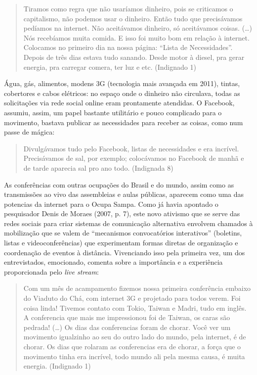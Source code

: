 \begin{quote}
Tiramos como regra que não usaríamos dinheiro, pois se criticamos o
capitalismo, não podemos usar o dinheiro. Então tudo que precisávamos
pedíamos na internet. Não aceitávamos dinheiro, só aceitávamos coisas.
(\ldots{}) Nós recebíamos muita comida. E isso foi muito bom em relação à
internet. Colocamos no primeiro dia na nossa página: ``Lista de
Necessidades''. Depois de três dias estava tudo sanando. Desde motor à
diesel, pra gerar energia, pra carregar comera, ter luz e etc.
(Indignado 1)
\end{quote}

Água, gás, alimentos, modens 3G (tecnologia mais avançada em 2011),
tintas, cobertores e cabos elétricos: no espaço onde o dinheiro não
circulava, todas as solicitações via rede social online eram prontamente
atendidas. O Facebook, assumiu, assim, um papel bastante utilitário e
pouco complicado para o movimento, bastava publicar as necessidades para
receber as coisas, como num passe de mágica:

\begin{quote}
Divulgávamos tudo pelo Facebook, listas de necessidades e era incrível.
Precisávamos de sal, por exemplo; colocávamos no Facebook de manhã e de
tarde aparecia sal pro ano todo. (Indignada 8)
\end{quote}

As conferências com outras ocupações do Brasil e do mundo, assim como as
transmissões ao vivo das assembleias e aulas públicas, aparecem como uma
das potencias da internet para o Ocupa Sampa. Como já havia apontado o
pesquisador Denis de Moraes (2007, p. 7), este novo ativismo que se
serve das redes sociais para criar sistemas de comunicação alternativa
envolvem chamados à mobilização que se valem de ``mecanismos
convocatórios interativos'' (boletins, listas e videoconferências) que
experimentam formas diretas de organização e coordenação de eventos à
distância. Vivenciando isso pela primeira vez, um dos entrevistados,
emocionado, comenta sobre a importância e a experiência proporcionada
pelo \emph{live stream}:

\begin{quote}
Com um mês de acampamento fizemos nossa primeira conferência embaixo do
Viaduto do Chá, com internet 3G e projetado para todos verem. Foi coisa
linda! Tivemos contato com Tokio, Taiwan e Madri, tudo em inglês. A
conferencia que mais me impressionou foi de Taiwan, os caras são
pedrada! (\ldots{}) Os dias das conferencias foram de chorar. Você ver um
movimento igualzinho ao seu do outro lado do mundo, pela internet, é de
chorar. Os dias que rolaram as conferencias era de chorar, a força que o
movimento tinha era incrível, todo mundo ali pela mesma causa, é muita
energia. (Indignado 1)
\end{quote}

